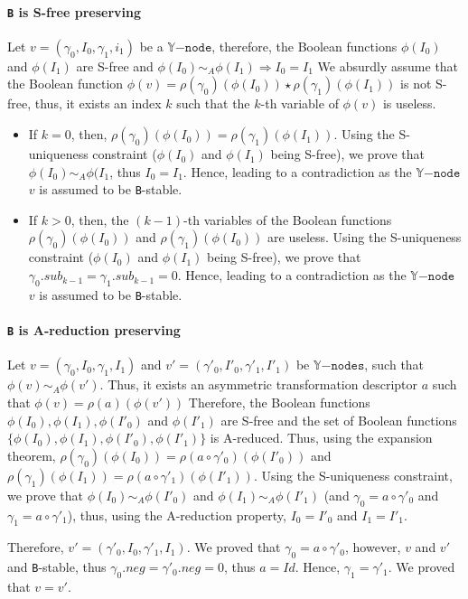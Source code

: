 \documentclass[a4paper,10pt]{article}
\newcommand{\Y}{\mathbb{Y}}
\newcommand{\Ynode}{\Y\mathtt{-node}}
\newcommand{\Ynodes}{\Y\mathtt{-nodes}}
\begin{document}
\paragraph{\texttt{B} is S-free preserving\\}
Let $v=(\gamma_0, I_0, \gamma_1, i_1)$ be a $\Ynode$, therefore, the Boolean functions $\phi(I_0)$ and $\phi(I_1)$ are S-free and $\phi(I_0) \sim_A \phi(I_1) \Rightarrow I_0 = I_1$
We absurdly assume that the Boolean function $\phi(v) = \rho(\gamma_0)(\phi(I_0)) \star \rho(\gamma_1)(\phi(I_1))$ is not S-free, thus, it exists an index $k$ such that the $k$-th variable of $\phi(v)$ is useless.
\begin{itemize}
\item If $k=0$, then, $\rho(\gamma_0)(\phi(I_0)) = \rho(\gamma_1)(\phi(I_1))$.
Using the S-uniqueness constraint ($\phi(I_0)$ and $\phi(I_1)$ being S-free), we prove that $\phi(I_0) \sim_A \phi(I_1$, thus $I_0 = I_1$.
Hence, leading to a contradiction as the $\Ynode$ $v$ is assumed to be \texttt{B}-stable.
\item If $k>0$, then, the $(k-1)$-th variables of the Boolean functions $\rho(\gamma_0)(\phi(I_0))$ and $\rho(\gamma_1)(\phi(I_0))$ are useless.
Using the S-uniqueness constraint ($\phi(I_0)$ and $\phi(I_1)$ being S-free), we prove that $\gamma_0.sub_{k-1} = \gamma_1.sub_{k-1} = 0$.
Hence, leading to a contradiction as the $\Ynode$ $v$ is assumed to be \texttt{B}-stable.
\end{itemize}

\paragraph{\texttt{B} is A-reduction preserving\\}
Let $v=(\gamma_0, I_0, \gamma_1, I_1)$ and $v'=(\gamma'_0, I'_0, \gamma'_1, I'_1)$ be $\Ynodes$, such that $\phi(v) \sim_A \phi(v')$.
Thus, it exists an asymmetric transformation descriptor $a$ such that $\phi(v) = \rho(a)(\phi(v'))$
Therefore, the Boolean functions $\phi(I_0), \phi(I_1), \phi(I'_0)$ and $\phi(I'_1)$ are S-free and the set of Boolean functions $\{\phi(I_0), \phi(I_1), \phi(I'_0), \phi(I'_1)\}$ is A-reduced.
Thus, using the expansion theorem, $\rho(\gamma_0)(\phi(I_0)) = \rho(a \circ \gamma'_0)(\phi(I'_0))$ and $\rho(\gamma_1)(\phi(I_1)) = \rho(a \circ \gamma'_1)(\phi(I'_1))$.
Using the S-uniqueness constraint, we prove that $\phi(I_0) \sim_A \phi(I'_0)$ and $\phi(I_1) \sim_A \phi(I'_1)$ (and $\gamma_0 = a \circ \gamma'_0$ and $\gamma_1 = a \circ \gamma'_1$), thus, using the A-reduction property, $I_0 = I'_0$ and $I_1 = I'_1$.

Therefore, $v'=(\gamma'_0, I_0, \gamma'_1, I_1)$.
We proved that $\gamma_0 = a \circ \gamma'_0$, however, $v$ and $v'$ and \texttt{B}-stable, thus $\gamma_0.neg = \gamma'_0.neg = 0$, thus $a = Id$.
Hence, $\gamma_1 = \gamma'_1$.
We proved that $v = v'$.
\end{document}
